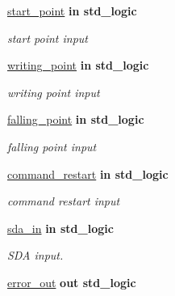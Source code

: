 \begin{DoxyCompactItemize}
\hyperlink{classrestart__generator_a3d23bfd08667d8c545bdbd9bf1048041}{start\+\_\+point}  {\bfseries {\bfseries \textcolor{vhdlchar}{in}\textcolor{vhdlchar}{ }}} {\bfseries \textcolor{vhdlchar}{std\+\_\+logic}\textcolor{vhdlchar}{ }} 
\begin{DoxyCompactList}\small\item\em start point input \end{DoxyCompactList}\item 
\hyperlink{classrestart__generator_a12d6c9c482b5975efc30e34bb0951659}{writing\+\_\+point}  {\bfseries {\bfseries \textcolor{vhdlchar}{in}\textcolor{vhdlchar}{ }}} {\bfseries \textcolor{vhdlchar}{std\+\_\+logic}\textcolor{vhdlchar}{ }} 
\begin{DoxyCompactList}\small\item\em writing point input \end{DoxyCompactList}\item 
\hyperlink{classrestart__generator_ae13d7074835244efb7bd3538f42162b9}{falling\+\_\+point}  {\bfseries {\bfseries \textcolor{vhdlchar}{in}\textcolor{vhdlchar}{ }}} {\bfseries \textcolor{vhdlchar}{std\+\_\+logic}\textcolor{vhdlchar}{ }} 
\begin{DoxyCompactList}\small\item\em falling point input \end{DoxyCompactList}\item 
\hyperlink{classrestart__generator_af4d45aa576af9f7ae13599077e0ac873}{command\+\_\+restart}  {\bfseries {\bfseries \textcolor{vhdlchar}{in}\textcolor{vhdlchar}{ }}} {\bfseries \textcolor{vhdlchar}{std\+\_\+logic}\textcolor{vhdlchar}{ }} 
\begin{DoxyCompactList}\small\item\em command restart input \end{DoxyCompactList}\item 
\hyperlink{classrestart__generator_abee794776f0ccd767e459566850c3656}{sda\+\_\+in}  {\bfseries {\bfseries \textcolor{vhdlchar}{in}\textcolor{vhdlchar}{ }}} {\bfseries \textcolor{vhdlchar}{std\+\_\+logic}\textcolor{vhdlchar}{ }} 
\begin{DoxyCompactList}\small\item\em S\+DA input. \end{DoxyCompactList}\item 
\hyperlink{classrestart__generator_a7d3323a10c64f9e722f7b8e5e5a7ad6a}{error\+\_\+out}  {\bfseries {\bfseries \textcolor{vhdlchar}{out}\textcolor{vhdlchar}{ }}} {\bfseries \textcolor{vhdlchar}{std\+\_\+logic}\textcolor{vhdlchar}{ }} 

\end{DoxyCompactItemize}
